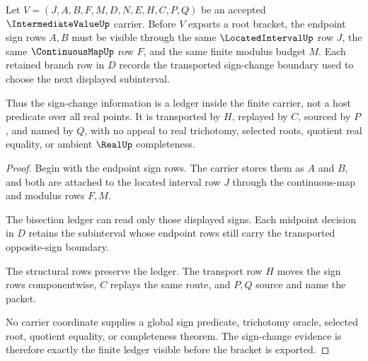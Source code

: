 \begin{theorem}
\label{thm:intermediatevalue-sign-change-ledger}
Let $V=(J,A,B,F,M,D,N,E,H,C,P,Q)$ be an accepted $\IntermediateValueUp$ carrier. Before $V$ exports a root bracket, the endpoint sign rows $A,B$ must be visible through the same $\LocatedIntervalUp$ row $J$, the same $\ContinuousMapUp$ row $F$, and the same finite modulus budget $M$. Each retained branch row in $D$ records the transported sign-change boundary used to choose the next displayed subinterval.

Thus the sign-change information is a ledger inside the finite carrier, not a host predicate over all real points. It is transported by $H$, replayed by $C$, sourced by $P$, and named by $Q$, with no appeal to real trichotomy, selected roots, quotient real equality, or ambient $\RealUp$ completeness.
\end{theorem}
\begin{proof}
Begin with the endpoint sign rows. The carrier stores them as $A$ and $B$, and both are attached to the located interval row $J$ through the continuous-map and modulus rows $F,M$.

The bisection ledger can read only those displayed signs. Each midpoint decision in $D$ retains the subinterval whose endpoint rows still carry the transported opposite-sign boundary.

The structural rows preserve the ledger. The transport row $H$ moves the sign rows componentwise, $C$ replays the same route, and $P,Q$ source and name the packet.

No carrier coordinate supplies a global sign predicate, trichotomy oracle, selected root, quotient equality, or completeness theorem. The sign-change evidence is therefore exactly the finite ledger visible before the bracket is exported.
\end{proof}

